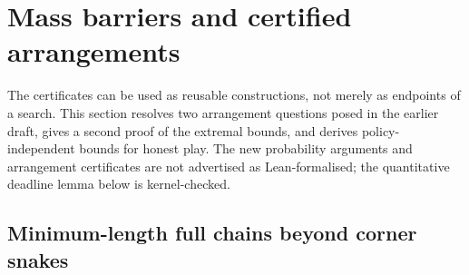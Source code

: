 \section{Mass barriers and certified arrangements}
\label{sec:deductions}

The certificates can be used as reusable constructions, not merely as
endpoints of a search. This section resolves two arrangement questions
posed in the earlier draft, gives a second proof of the extremal bounds,
and derives policy-independent bounds for honest play. The new
probability arguments and arrangement certificates are not advertised as
Lean-formalised; the quantitative deadline lemma below is kernel-checked.

\subsection{Minimum-length full chains beyond corner snakes}
\label{sec:arrangements}

